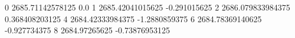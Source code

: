 0 2685.71142578125 0.0
1 2685.42041015625 -0.291015625
2 2686.079833984375 0.368408203125
4 2684.42333984375 -1.2880859375
6 2684.78369140625 -0.927734375
8 2684.97265625 -0.73876953125
